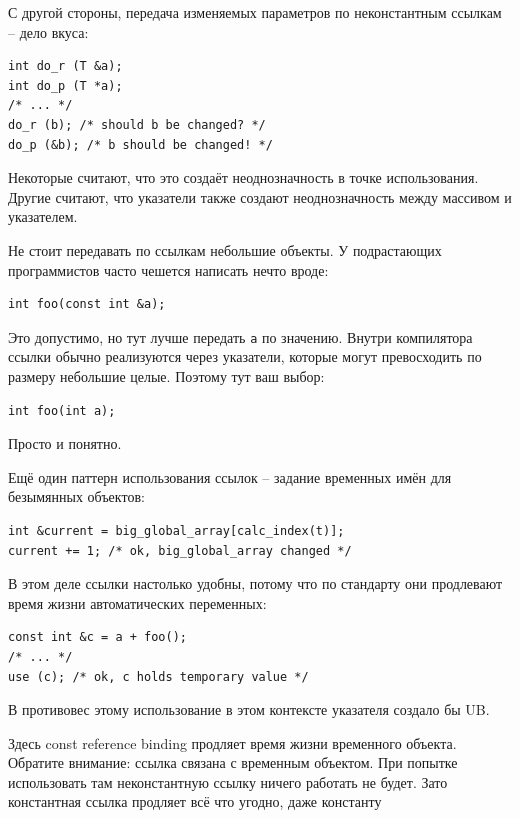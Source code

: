 \documentclass[a4paper,12pt,oneside]{article}
\begin{document}
С другой стороны, передача изменяемых параметров по неконстантным ссылкам -- дело вкуса:

\begin{lstlisting}
int do_r (T &a);
int do_p (T *a);
/* ... */
do_r (b); /* should b be changed? */
do_p (&b); /* b should be changed! */
\end{lstlisting}

Некоторые считают, что это создаёт неоднозначность в точке использования. Другие считают, что указатели также создают неоднозначность между массивом и указателем.

Не стоит передавать по ссылкам небольшие объекты. У подрастающих программистов часто чешется написать нечто вроде:

\begin{lstlisting}
int foo(const int &a);
\end{lstlisting}

Это допустимо, но тут лучше передать \lstinline!a! по значению. Внутри компилятора ссылки обычно реализуются через указатели, которые могут превосходить по размеру небольшие целые. Поэтому тут ваш выбор:

\begin{lstlisting}
int foo(int a);
\end{lstlisting}

Просто и понятно.

Ещё один паттерн использования ссылок -- задание временных имён для безымянных объектов:

\begin{lstlisting}
int &current = big_global_array[calc_index(t)];
current += 1; /* ok, big_global_array changed */
\end{lstlisting}

В этом деле ссылки настолько удобны, потому что по стандарту они продлевают время жизни автоматических переменных:

\begin{lstlisting}
const int &c = a + foo();
/* ... */
use (c); /* ok, c holds temporary value */
\end{lstlisting}

В противовес этому использование в этом контексте указателя создало бы UB.

Здесь const reference binding продляет время жизни временного объекта. Обратите внимание: ссылка связана с временным объектом. При попытке использовать там неконстантную ссылку ничего работать не будет. Зато константная ссылка продляет всё что угодно, даже константу
\end{document}
